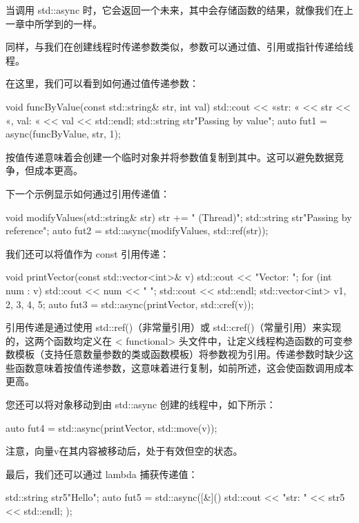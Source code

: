 当调用 std::async 时，它会返回一个未来，其中会存储函数的结果，就像我们在上一章中所学到的一样。


同样，与我们在创建线程时传递参数类似，参数可以通过值、引用或指针传递给线程。

在这里，我们可以看到如何通过值传递参数：

\begin{cpp}
void funcByValue(const std::string& str, int val) {
    std::cout << «str: « << str << «, val: « << val
              << std::endl;
}
std::string str{"Passing by value"};
auto fut1 = async(funcByValue, str, 1);
\end{cpp}

按值传递意味着会创建一个临时对象并将参数值复制到其中。这可以避免数据竞争，但成本更高。

下一个示例显示如何通过引用传递值：

\begin{cpp}
void modifyValues(std::string& str) {
    str += " (Thread)";
}
std::string str{"Passing by reference"};
auto fut2 = std::async(modifyValues, std::ref(str));
\end{cpp}

我们还可以将值作为 const 引用传递：

\begin{cpp}
void printVector(const std::vector<int>& v) {
    std::cout << "Vector: ";
    for (int num : v) {
        std::cout << num << " ";
    }
    std::cout << std::endl;
}
std::vector<int> v{1, 2, 3, 4, 5};
auto fut3 = std::async(printVector, std::cref(v));
\end{cpp}

引用传递是通过使用 std::ref()（非常量引用）或 std::cref()（常量引用）来实现的，这两个函数均定义在 < functional> 头文件中，让定义线程构造函数的可变参数模板（支持任意数量参数的类或函数模板）将参数视为引用。传递参数时缺少这些函数意味着按值传递参数，这意味着进行复制，如前所述，这会使函数调用成本更高。

您还可以将对象移动到由 std::async 创建的线程中，如下所示：

\begin{cpp}
auto fut4 = std::async(printVector, std::move(v));
\end{cpp}

注意，向量v在其内容被移动后，处于有效但空的状态。

最后，我们还可以通过 lambda 捕获传递值：

\begin{cpp}
std::string str5{"Hello"};
auto fut5 = std::async([&]() {
    std::cout << "str: " << str5 << std::endl;
});
\end{cpp}

